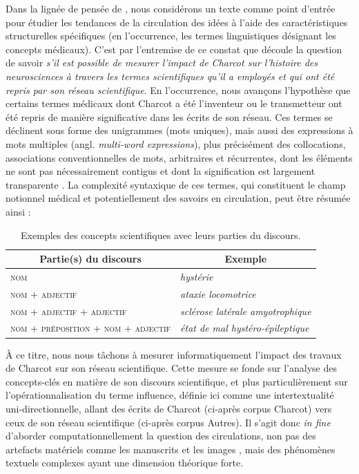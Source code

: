 Dans la lignée de pensée de \citet{milia2023}, nous considérons un texte comme point d'entrée pour étudier les tendances de la circulation des idées à l'aide des caractéristiques structurelles spécifiques (en l'occurrence, les termes linguistiques désignant les concepts médicaux). C'est par l'entremise de ce constat que découle la question de savoir \textit{s'il est possible de mesurer l'impact de Charcot sur l'histoire des neurosciences à travers les termes scientifiques qu'il a employés et qui ont été repris par son réseau scientifique}. En l'occurrence, nous avançons l'hypothèse que certains termes médicaux dont Charcot a été l'inventeur ou le transmetteur ont été repris de manière significative dans les écrits de son réseau. Ces termes se déclinent sous forme des unigrammes (mots uniques), mais aussi des expressions à mots multiples (angl. \textit{multi-word expressions}), plus précisément des collocations, \og{}associations conventionnelles de mots, arbitraires et récurrentes, dont les éléments ne sont pas nécessairement contigus et dont la signification est largement transparente\fg{} \citep[p. 96]{nerima2006}. La complexité syntaxique de ces termes, qui constituent le champ notionnel médical et potentiellement des savoirs en circulation, peut être résumée ainsi :
\begin{table}[h]
	\centering
	\begin{tabular}{l|l}
		\multicolumn{1}{c|}{Partie(s) du discours} & \multicolumn{1}{c}{Exemple} \\
		\hline
		\textsc{nom} & \textit{hystérie}\\
		\textsc{nom + adjectif} & \textit{ataxie locomotrice}\\
		\textsc{nom + adjectif + adjectif} & \textit{sclérose latérale amyotrophique}\\
		\textsc{nom + préposition + nom + adjectif} & \textit{état de mal hystéro-épileptique}
	\end{tabular}
	\caption{Exemples des concepts scientifiques avec leurs parties du discours.}
\end{table}

À ce titre, nous nous tâchons à mesurer informatiquement l'impact des travaux de Charcot sur son réseau scientifique. Cette mesure se fonde sur l'analyse des concepts-clés en matière de son discours scientifique, et plus particulièrement sur l'opérationnalisation du terme \og{}influence\fg{}, définie ici comme une intertextualité uni-directionnelle, allant des écrits de Charcot (ci-après corpus \og{}Charcot\fg{}) vers ceux de son réseau scientifique (ci-après corpus \og{}Autres\fg{}). Il s'agit donc \textit{in fine} d'aborder computationnellement la question des circulations, non pas des artefacts matériels comme les manuscrits \citep{gabay2021katabase} et les images \citep{joyeux2019visual}, mais des phénomènes textuels complexes \citep{manjavacas} ayant une dimension théorique forte. 

